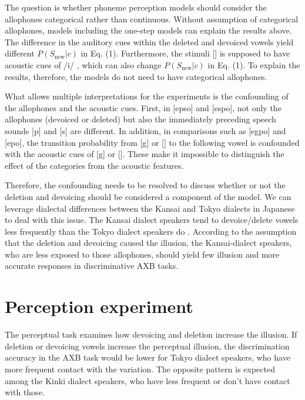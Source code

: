 \documentclass[a4paper,11pt,twocolumn]{article}
\begin{document}
The question is whether phoneme perception models should consider the allophones categorical rather than continuous. Without assumption of categorical allophones, models including the one-step models can explain the results above. The difference in the auditory cues within the deleted and devoiced vowels yield different $P(S_{\text{new}}|c)$ in Eq. (1). Furthermore, the stimuli [\textctc] is supposed to have acoustic cues of /i/ \cite{kubozono1999japanese_eng}, which can also change $P(S_{\text{new}}|c)$ in Eq. (1). To explain the results, therefore, the models do not need to have categorical allophones.

What allows multiple interpretations for the experiments is the confounding of the allophones and the acoustic cues. First, in [ep\textsubring{\textturnm}so] and [espo], not only the allophones (devoiced or deleted) but also the immediately preceding speech sounds [p] and [s] are different. In addition, in comparisons such as [egpo] and [e\textctc{}po], the transition probability from [g] or [\textctc] to the following vowel is confounded with the acoustic cues of [g] or [\textctc]. These make it impossible to distinguish the effect of the categories from the acoustic features.

Therefore, the confounding needs to be resolved to discuss whether or not the deletion and devoicing should be considered a component of the model. We can leverage dialectal differences between the Kansai and Tokyo dialects in Japanese \cite{kishiyama2022onestep} to deal with this issue. The Kansai dialect speakers tend to devoice/delete vowels less frequently than the Tokyo dialect speakers do \cite{byun2011_eng, byun2012_eng}. According to the assumption that the deletion and devoicing caused the illusion, the Kansai-dialect speakers, who are less exposed to those allophones, should yield few illusion and more accurate responses in discriminative AXB tasks.

\section{Perception experiment}

The perceptual task examines how devoicing and deletion increase the illusion. If deletion or devoicing vowels increase the perceptual illusion, the discrimination accuracy in the AXB task would be lower for Tokyo dialect speakers, who have more frequent contact with the variation. The opposite pattern is expected among the Kinki dialect speakers, who have less frequent or don't have contact with those.
\end{document}
